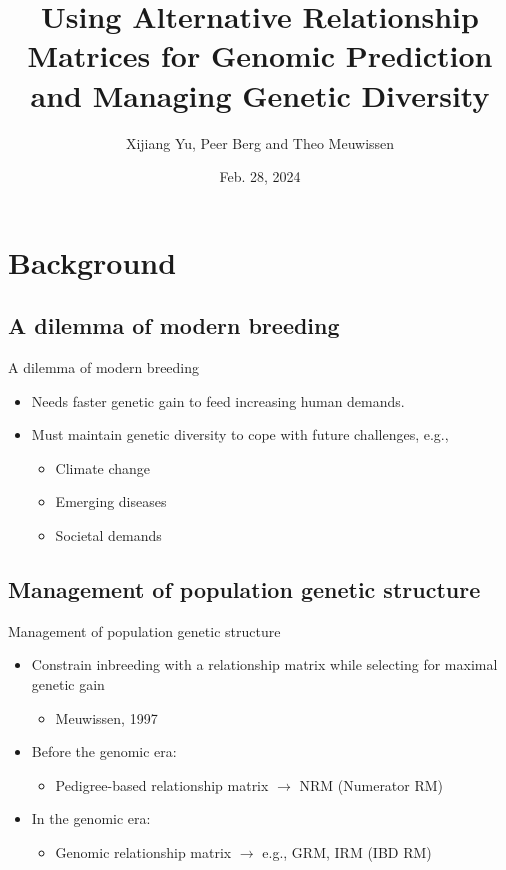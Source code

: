 \documentclass{beamer}
\begin{document}
\title[Using A, G, I for genomic prediction \& management]{Using Alternative Relationship Matrices for Genomic Prediction and Managing Genetic Diversity}
\author[Xijiang Yu, PB \& TM]{Xijiang Yu, Peer Berg and Theo Meuwissen}
\date{Feb. 28, 2024}

\frame{
  \titlepage
}

\section{Background}
\subsection{A dilemma of modern breeding}
\begin{frame}{A dilemma of modern breeding}
  \begin{itemize}
  \item Needs faster genetic gain to feed increasing human demands.
  \item Must maintain genetic diversity to cope with future challenges, e.g.,
    \begin{itemize}
    \item Climate change
    \item Emerging diseases
    \item Societal demands
    \end{itemize}
  \end{itemize}
\end{frame}

\subsection{Management of population genetic structure}
\begin{frame}{Management of population genetic structure}
  \begin{itemize}
  \item Constrain inbreeding with a relationship matrix while selecting for maximal genetic gain
    \begin{itemize}
    \item Meuwissen, 1997 %
    \end{itemize}
  \item Before the genomic era:
    \begin{itemize}
    \item Pedigree-based relationship matrix $\to$ NRM (Numerator RM)
    \end{itemize}
  \item In the genomic era:
    \begin{itemize}
    \item Genomic relationship matrix $\to$ e.g., GRM, IRM (IBD RM)
    \end{itemize}
  \end{itemize}
\end{frame}
\end{document}
